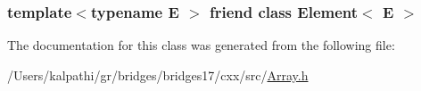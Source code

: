 \subsubsection[{Element$<$ E $>$}]{\setlength{\rightskip}{0pt plus 5cm}template$<$typename E $>$ friend class {\bf Element}$<$ E $>$\hspace{0.3cm}{\ttfamily [friend]}}\label{classbridges_1_1_array_a8c6ff2a8dd3e27346dd25f588a78828a}


The documentation for this class was generated from the following file\+:\begin{DoxyCompactItemize}
\item 
/\+Users/kalpathi/gr/bridges/bridges17/cxx/src/\hyperlink{_array_8h}{Array.\+h}\end{DoxyCompactItemize}
